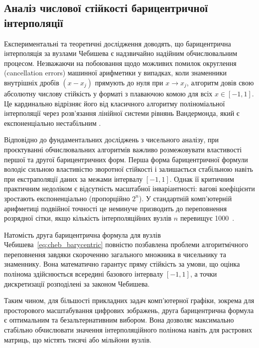 \subsection{Аналіз числової стійкості барицентричної інтерполяції}

Експериментальні та теоретичні дослідження доводять, що барицентрична інтерполяція за вузлами Чебишева є надзвичайно надійним обчислювальним процесом. Незважаючи на побоювання щодо можливих помилок округлення (cancellation errors) машинної арифметики у випадках, коли знаменники внутрішніх дробів $(x - x_j)$ прямують до нуля при $x \to x_j$, алгоритм довів свою абсолютну числову стійкість у форматі з плаваючою комою для всіх $x \in [-1, 1]$. Це кардинально відрізняє його від класичного алгоритму поліноміальної інтерполяції через розв'язання лінійної системи рівнянь Вандермонда, який є експоненціально нестабільним \cite{trefethen2013approximation}.

Відповідно до фундаментальних досліджень з чисельного аналізу, при проєктуванні обчислювальних алгоритмів важливо розмежовувати властивості першої та другої барицентричних форм. Перша форма барицентричної формули володіє сильною властивістю зворотної стійкості і залишається стабільною навіть при екстраполяції даних за межами інтервалу $[-1, 1]$. Однак її критичним практичним недоліком є відсутність масштабної інваріантності: вагові коефіцієнти зростають експоненціально (пропорційно $2^n$). У стандартній комп'ютерній арифметиці подвійної точності це неминуче призводить до переповнення розрядної сітки, якщо кількість інтерполяційних вузлів $n$ перевищує 1000~\cite{trefethen2013approximation}.

Натомість друга барицентрична формула для вузлів Чебишева~\eqref{eq:cheb_barycentric} повністю позбавлена проблеми алгоритмічного переповнення завдяки скороченню загального множника в чисельнику та знаменнику. Вона математично гарантує пряму стійкість за умови, що оцінка полінома здійснюється всередині базового інтервалу $[-1, 1]$, а точки дискретизації розподілені за законом Чебишева. 

Таким чином, для більшості прикладних задач комп'ютерної графіки, зокрема для просторового масштабування цифрових зображень, друга барицентрична формула є оптимальним та безальтернативним вибором. Вона дозволяє максимально стабільно обчислювати значення інтерполяційного полінома навіть для растрових матриць, що містять тисячі або мільйони вузлів. 